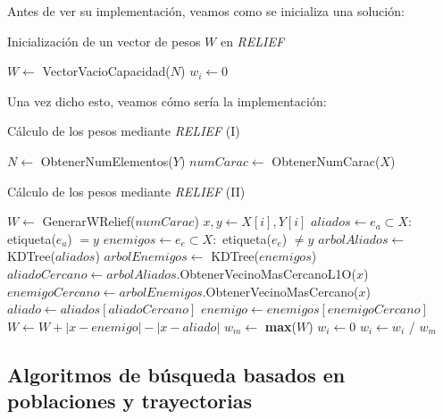 \documentclass[11pt,a4paper]{article}
\begin{document}
Antes de ver su implementación, veamos como se inicializa una solución:

\begin{algorithm}[H]
\caption{Inicialización de un vector de pesos $W$ en \textit{RELIEF}}
\begin{algorithmic}[1]
\State $W \gets$ VectorVacioCapacidad($N$)
	\State $w_i \gets 0$
\EndFor
\State {}
\EndFunction
\end{algorithmic}
\end{algorithm}

Una vez dicho esto, veamos cómo sería la implementación:

\begin{algorithm}[H]
\caption{Cálculo de los pesos mediante \textit{RELIEF} (I)}
\begin{algorithmic}[1]
\State $N \gets$ ObtenerNumElementos($Y$)
\State $numCarac \gets $ ObtenerNumCarac($X$)
\end{algorithmic}
\end{algorithm}

\begin{algorithm}[H]
\caption{Cálculo de los pesos mediante \textit{RELIEF} (II)}
\begin{algorithmic}
\State $W \gets $ GenerarWRelief($numCarac$)
	\State $x, y \gets X[i], Y[i]$
	\State $aliados \gets e_a \subset X :$ etiqueta($e_a$) $ = y$
	\State $enemigos \gets e_e \subset X:$ etiqueta($e_e$) $ \neq y$
	\State $arbolAliados \gets$ KDTree($aliados$)
	\State $arbolEnemigos \gets$ KDTree($enemigos$)
	\State $aliadoCercano \gets arbolAliados$.ObtenerVecinoMasCercanoL1O($x$)
	\State $enemigoCercano \gets arbolEnemigos$.ObtenerVecinoMasCercano($x$)
	\State $aliado \gets aliados[aliadoCercano]$
	\State $enemigo \gets enemigos[enemigoCercano]$
	\State $W \gets W + \left|x - enemigo\right| - \left|x - aliado\right|$
\EndFor
\State $w_m \gets$ \textbf{max}($W$)
		\State $w_i \gets 0$
	\Else
		\State $w_i \gets w_i$ / $w_m$
	\EndIf
\EndFor
\State {}
\EndFunction
\end{algorithmic}
\end{algorithm}

\newpage

\subsection{Algoritmos de búsqueda basados en poblaciones y trayectorias}
\end{document}
